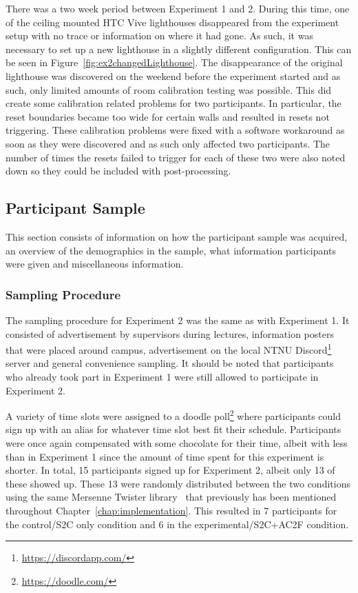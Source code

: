 There was a two week period between Experiment 1 and 2. During this time, one of the ceiling mounted HTC Vive lighthouses disappeared from the experiment setup with no trace or information on where it had gone. As such, it was necessary to set up a new lighthouse in a slightly different configuration. This can be seen in Figure~\ref{fig:ex2changedLighthouse}. The disappearance of the original lighthouse was discovered on the weekend before the experiment started and as such, only limited amounts of room calibration testing was possible. This did create some calibration related problems for two participants. In particular, the reset boundaries became too wide for certain walls and resulted in resets not triggering. These calibration problems were fixed with a software workaround as soon as they were discovered and as such only affected two participants. The number of times the resets failed to trigger for each of these two were also noted down so they could be included with post-processing. 

\subsection{Participant Sample}
This section consists of information on how the participant sample was acquired, an overview of the demographics in the sample, what information participants were given and miscellaneous information. 
   
\subsubsection{Sampling Procedure}
The sampling procedure for Experiment 2 was the same as with Experiment 1. It consisted of advertisement by supervisors during lectures, information posters that were placed around campus, advertisement on the local NTNU Discord\footnote{\url{https://discordapp.com/}} server and general convenience sampling. It should be noted that participants who already took part in Experiment 1 were still allowed to participate in Experiment 2.

A variety of time slots were assigned to a doodle poll\footnote{\url{https://doodle.com/}} where participants could sign up with an alias for whatever time slot best fit their schedule. Participants were once again compensated with some chocolate for their time, albeit with less than in Experiment 1 since the amount of time spent for this experiment is shorter. In total, 15 participants signed up for Experiment 2, albeit only 13 of these showed up. These 13 were randomly distributed between the two conditions using the same Mersenne Twister library~\cite{MersenneTwisterLibraryLink} that previously has been mentioned throughout Chapter~\ref{chap:implementation}. This resulted in 7 participants for the control/S2C only condition and 6 in the experimental/S2C+AC2F condition. 

